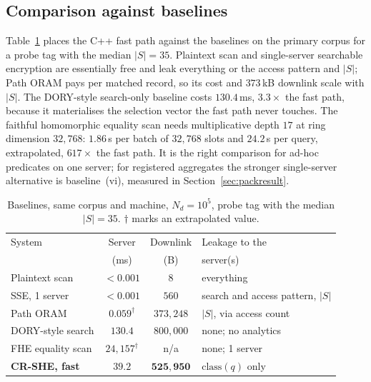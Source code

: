 \documentclass[a4paper,fleqn]{cas-sc}
\begin{document}
\subsection{Comparison against baselines}
Table~\ref{tab:baselines} places the C++ fast path against the baselines on
the primary corpus for a probe tag with the median $|S|=35$. Plaintext scan and
single-server searchable encryption are essentially free and leak everything
or the access pattern and $|S|$; Path ORAM pays per matched record, so its cost
and $373$\,kB downlink scale with $|S|$. The DORY-style search-only baseline
costs $130.4$\,ms, $3.3\times$ the fast path, because it materialises the
selection vector the fast path never touches. The faithful homomorphic
equality scan needs multiplicative depth $17$ at ring dimension $32{,}768$:
$1.86$\,s per batch of $32{,}768$ slots and $24.2$\,s per query, extrapolated,
$617\times$ the fast path. It is the right comparison for ad-hoc predicates on
one server; for registered aggregates the stronger single-server alternative is
baseline~(vi), measured in Section~\ref{sec:packresult}.

\begin{table}[pos=htbp]
\caption{Baselines, same corpus and machine, $N_d=10^5$, probe tag with the
median $|S|=35$. $\dagger$ marks an extrapolated value.}
\label{tab:baselines}
\centering
\footnotesize
\setlength{\tabcolsep}{3pt}
\renewcommand{\arraystretch}{1.2}
\begin{tabular}{@{}lcc>{\raggedright\arraybackslash}p{2.1cm}@{}}
\toprule
System & Server & Downlink & Leakage to the \\
       & (ms)   & (B)      & server(s) \\
\midrule
Plaintext scan        & $<0.001$ & $8$              & everything \\
SSE, 1 server         & $<0.001$ & $560$            & search and access
pattern, $|S|$ \\
Path ORAM             & $0.059^{\dagger}$ & $373{,}248$ & $|S|$, via access
count \\
DORY-style search     & $130.4$  & $800{,}000$      & none; no analytics \\
FHE equality scan     & $24{,}157^{\dagger}$ & n/a & none; 1 server \\
\midrule
\textbf{CR-SHE, fast} & $\mathbf{39.2}$ & $\mathbf{525{,}950}$ &
$\mathrm{class}(q)$ only \\
\bottomrule
\end{tabular}
\end{table}
\end{document}
